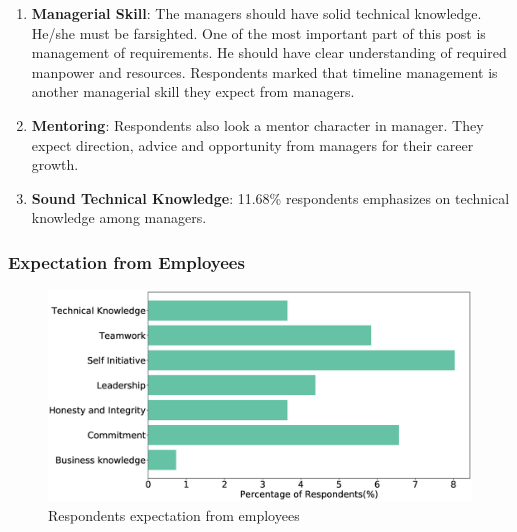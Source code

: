 \begin{enumerate}
    
    \item\textbf{Managerial Skill}: The managers should have solid technical knowledge. He/she must be farsighted. One of the most important part of this post is management of requirements. He should have clear  understanding of required manpower and resources. Respondents marked that timeline management is another managerial skill they expect from managers.
    
    
    \item \textbf{Mentoring}: Respondents also look  a mentor character in manager. They expect direction, advice and opportunity from managers for their career growth.
    
    
    \item\textbf{Sound Technical Knowledge}: 11.68\% respondents emphasizes on technical knowledge among managers.

\end{enumerate}


\subsubsection{Expectation from Employees}
\label{Expectation from Managers}
\begin{figure}[htbp]
\includegraphics[scale=0.28]{Figures/EmployeeExpectation.eps} 
\caption{Respondents expectation from employees}
\label{fig:employees expectation}
\end{figure}

